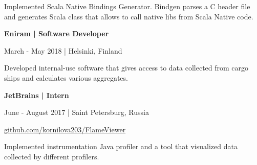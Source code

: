 \documentclass[9pt]{article}
\begin{document}
\begin{multicols}{2}
Implemented Scala Native Bindings Generator.
Bindgen parses a C header file and generates Scala class that allows to call native libs from Scala Native code.

\vspace{1.5em}

{\textbf{Eniram | Software Developer}}

\color{gray} March - May 2018 | Helsinki, Finland \color{black}

\vspace{0.3em}

Developed internal-use software that gives access to data collected from cargo ships and calculates various aggregates.

\vspace{1.5em}

{\textbf{JetBrains | Intern}}

\color{gray} June - August 2017 | Saint Petersburg, Russia \color{black}

\href{https://github.com/kornilova203/FlameViewer}{github.com/kornilova203/FlameViewer}

\vspace{0.3em}

Implemented instrumentation Java profiler and a tool that visualized data collected by different profilers.


\end{multicols}
\end{document}

